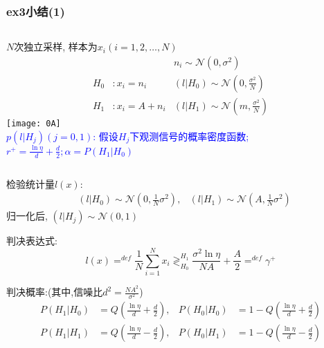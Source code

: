 \begin{frame}[shrink]
\frametitle{ex3小结(1)}
\begin{columns}
	$N$次独立采样, 样本为$x_i(i=1,2,\dots,N)$
	\begin{align*}
	&&n_i\sim\mathcal{N}(0,\sigma^2)\\ 
	H_0 &:x_i=n_i   &(l|H_0)\sim\mathcal{N}(0,\frac{\sigma^2}{N})\\
	H_1 &:x_i=A+n_i &(l|H_1)\sim\mathcal{N}(m,\frac{\sigma^2}{N})
	\end{align*}
	\texttt{[image: 0A]}\\
	\scriptsize
	\textcolor{blue}{$p(l|H_j)(j=0,1)$: 假设$H_j$下观测信号的概率密度函数; $r^+=\frac{\ln\eta}{d}+\frac{d}{2}; \alpha=P(H_1|H_0)$}
\end{columns}

\bigskip

检验统计量$l(x)$:
\begin{align*}
&(l|H_0)\sim\mathcal{N}(0,\frac{1}{N}\sigma^2), &(l|H_1)\sim\mathcal{N}(A,\frac{1}{N}\sigma^2)
\end{align*}
归一化后, $(l|H_j)\sim\mathcal{N}(0,1)$

判决表达式:
\[
l(x)\mathop{=}^{def}\frac{1}{N}\sum\limits_{i=1}^Nx_i\mathop{\gtrless}_{H_0}^{H_1}\frac{\sigma^2\ln\eta}{NA}+\frac{A}{2}\mathop{=}^{def}\gamma^+
\]

判决概率:(其中,信噪比$d^2=\frac{NA^2}{\sigma^2}$)
\begin{align*}
P(H_1|H_0)&=Q\left(\frac{\ln\eta}{d}+\frac{d}{2}\right), &P(H_0|H_0)&=1-Q\left(\frac{\ln\eta}{d}+\frac{d}{2}\right)\\
P(H_1|H_1)&=Q\left(\frac{\ln\eta}{d}-\frac{d}{2}\right),
&P(H_0|H_1)&=1-Q\left(\frac{\ln\eta}{d}-\frac{d}{2}\right)
\end{align*}
\end{frame}

